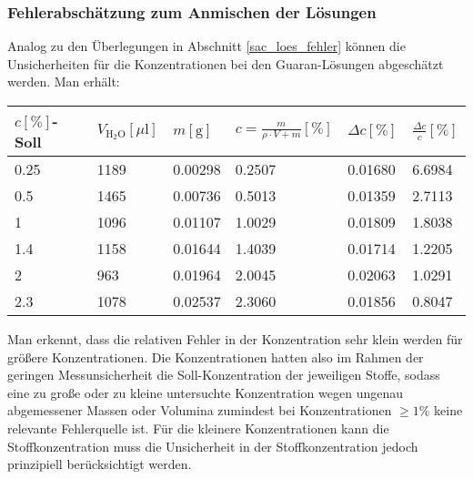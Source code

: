 \documentclass[11pt,a4paper,oneside]{scrartcl}
\begin{document}
\subsubsection{Fehlerabschätzung zum Anmischen der Lösungen}
Analog zu den Überlegungen in Abschnitt \ref{sac_loes_fehler} können die Unsicherheiten für die Konzentrationen bei den Guaran-Lösungen abgeschätzt werden. Man erhält:\\
\begin{table}[H]
    \centering
    \begin{tabular}{llllll}
    \hline
        $c [\%]$-Soll & $V_{\mathrm{H_2O}} [\mu \mathrm l]$ & $m [\mathrm g]$ & $c=\frac{m}{\rho\cdot V+m}[\%]$ & $\Delta c[\%]$ & $\frac{\Delta c}{c}[\%]$ \\ \hline
             0.25 & 1189 & 0.00298 & 0.2507 & 0.01680 & 6.6984 \\ 
        0.5 & 1465 & 0.00736 & 0.5013 & 0.01359 & 2.7113 \\ 
        1 & 1096 & 0.01107 & 1.0029 & 0.01809 & 1.8038 \\ 
        1.4 & 1158 & 0.01644 & 1.4039 & 0.01714 & 1.2205 \\ 
        2 & 963 & 0.01964 & 2.0045 & 0.02063 & 1.0291 \\ 
        2.3 & 1078 & 0.02537 & 2.3060 & 0.01856 & 0.8047 \\  \hline
    \end{tabular}
\end{table}
Man erkennt, dass die relativen Fehler in der Konzentration sehr klein werden für größere Konzentrationen. Die Konzentrationen hatten also im Rahmen der geringen Messunsicherheit die Soll-Konzentration der jeweiligen Stoffe, sodass eine zu große oder zu kleine untersuchte Konzentration wegen ungenau abgemessener Massen oder Volumina zumindest bei Konzentrationen $\geq 1\%$ keine relevante Fehlerquelle ist. Für die kleinere Konzentrationen kann die Stoffkonzentration muss die Unsicherheit in der Stoffkonzentration jedoch prinzipiell berücksichtigt werden.
\end{document}
